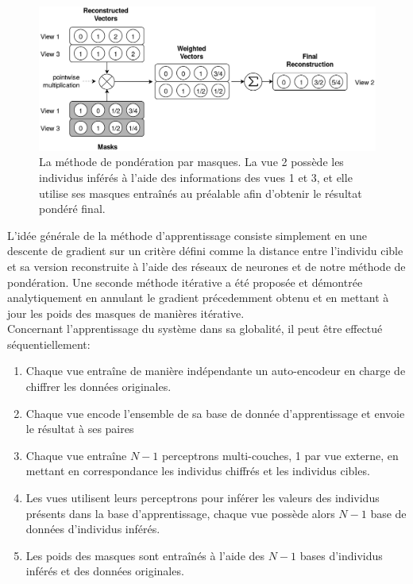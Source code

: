 	\begin{figure}[H]
		\centering
        \includegraphics[width=\textwidth]{img/mwm.png}
        \caption{La méthode de pondération par masques. La vue 2 possède les individus inférés à l'aide des informations des vues 1 et 3, et elle utilise ses masques entraînés au préalable afin d'obtenir le résultat pondéré final.}
\label{sum_fig:sum_mwm}
	\end{figure}

    L'idée générale de la méthode d'apprentissage consiste simplement en une descente de gradient sur un critère défini comme la distance entre l'individu cible et sa version reconstruite à l'aide des réseaux de neurones et de notre méthode de pondération. Une seconde méthode itérative a été proposée et démontrée analytiquement en annulant le gradient précedemment obtenu et en mettant à jour les poids des masques de manières itérative.\\

    Concernant l'apprentissage du système dans sa globalité, il peut être effectué séquentiellement:
    \begin{enumerate}
        \item Chaque vue entraîne de manière indépendante un auto-encodeur en charge de chiffrer les données originales.
        \item Chaque vue encode l'ensemble de sa base de donnée d'apprentissage et envoie le résultat à ses paires
        \item Chaque vue entraîne $N-1$ perceptrons multi-couches, 1 par vue externe, en mettant en correspondance les individus chiffrés et les individus cibles.
        \item Les vues utilisent leurs perceptrons pour inférer les valeurs des individus présents dans la base d'apprentissage, chaque vue possède alors $N-1$ base de données d'individus inférés.
        \item Les poids des masques sont entraînés à l'aide des $N-1$ bases d'individus inférés et des données originales.\\
    \end{enumerate}

